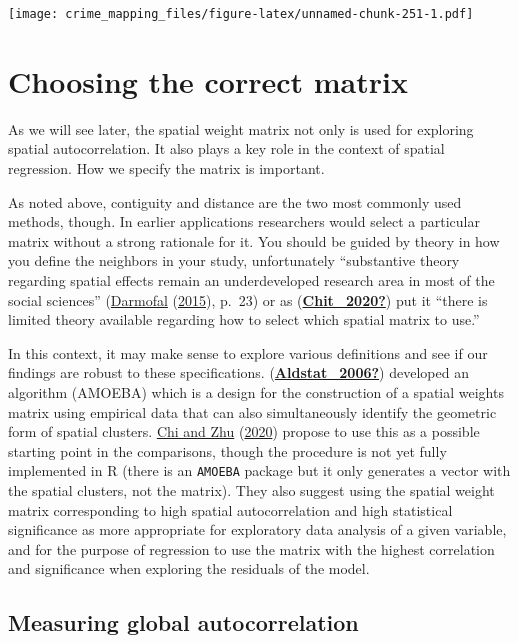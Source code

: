 \documentclass[
  krantz2]{krantz}
\begin{document}
\texttt{[image: crime\_mapping\_files/figure-latex/unnamed-chunk-251-1.pdf]}

\hypertarget{choosing-the-correct-matrix}{%
\section{Choosing the correct matrix}\label{choosing-the-correct-matrix}}

As we will see later, the spatial weight matrix not only is used for exploring spatial autocorrelation. It also plays a key role in the context of spatial regression. How we specify the matrix is important.

As noted above, contiguity and distance are the two most commonly used methods, though. In earlier applications researchers would select a particular matrix without a strong rationale for it. You should be guided by theory in how you define the neighbors in your study, unfortunately ``substantive theory regarding spatial effects remain an underdeveloped research area in most of the social sciences'' (\protect\hyperlink{ref-Darmofal_2015}{Darmofal} (\protect\hyperlink{ref-Darmofal_2015}{2015}), p.~23) or as (\protect\hyperlink{ref-Chit_2020}{\textbf{Chit\_2020?}}) put it ``there is limited theory available regarding how to select which spatial matrix to use.''

In this context, it may make sense to explore various definitions and see if our findings are robust to these specifications. (\protect\hyperlink{ref-Aldstat_2006}{\textbf{Aldstat\_2006?}}) developed an algorithm (AMOEBA) which is a design for the construction of a spatial weights matrix using empirical data that can also simultaneously identify the geometric form of spatial clusters. \protect\hyperlink{ref-Chi_2020}{Chi and Zhu} (\protect\hyperlink{ref-Chi_2020}{2020}) propose to use this as a possible starting point in the comparisons, though the procedure is not yet fully implemented in R (there is an \texttt{AMOEBA} package but it only generates a vector with the spatial clusters, not the matrix). They also suggest using the spatial weight matrix corresponding to high spatial autocorrelation and high statistical significance as more appropriate for exploratory data analysis of a given variable, and for the purpose of regression to use the matrix with the highest correlation and significance when exploring the residuals of the model.

\hypertarget{measuring-global-autocorrelation}{%
\subsection{Measuring global autocorrelation}\label{measuring-global-autocorrelation}}
\end{document}
